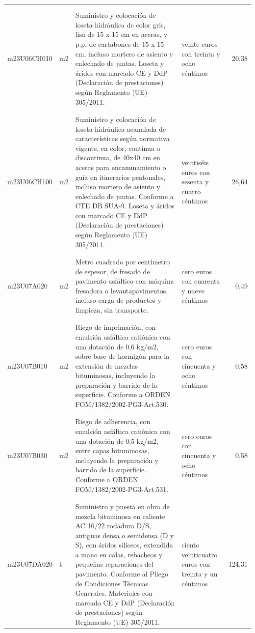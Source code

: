\begin{supertabular}{|l|l|p{5cm}|p{3cm}|r|}
&&&&\\%
&&&&\\%
m23U06CH010&m2&Suministro y colocación de loseta hidráulica de color gris, lisa de 15 x 15 cm en aceras, y p.p. de cartabones de 15 x 15 cm, incluso mortero de asiento y enlechado de juntas. Loseta y áridos con marcado CE y DdP (Declaración de prestaciones) según Reglamento (UE) 305/2011.&veinte euros con treinta y ocho céntimos&20,38\\%
&&&&\\%
&&&&\\%
m23U06CH100&m2&Suministro y colocación de loseta hidráulica acanalada de características según normativa vigente, en color, continua o discontinua, de 40x40 cm en aceras para encaminamiento o guía en itinerarios peatonales, incluso mortero de asiento y enlechado de juntas. Conforme a CTE DB SUA{-}9. Loseta y áridos con marcado CE y DdP (Declaración de prestaciones) según Reglamento (UE) 305/2011.&veintiséis euros con sesenta y cuatro céntimos&26,64\\%
&&&&\\%
&&&&\\%
m23U07A020&m2&Metro cuadrado por centímetro de espesor, de fresado de pavimento asfáltico con máquina fresadora o levantapavimentos, incluso carga de productos y limpieza, sin transporte.&cero euros con cuarenta y nueve céntimos&0,49\\%
&&&&\\%
&&&&\\%
m23U07B010&m2&Riego de imprimación, con emulsión asfáltica catiónica con una dotación de 0,6 kg/m2, sobre base de hormigón para la extensión de mezclas bituminosas, incluyendo la preparación y barrido de la superficie. Conforme a ORDEN FOM/1382/2002{-}PG3{-}Art.530.&cero euros con cincuenta y ocho céntimos&0,58\\%
&&&&\\%
&&&&\\%
m23U07B030&m2&Riego de adherencia, con emulsión asfáltica catiónica con una dotación de 0,5 kg/m2, entre capas bituminosas, incluyendo la preparación y barrido de la superficie. Conforme a ORDEN FOM/1382/2002{-}PG3{-}Art.531.&cero euros con cincuenta y ocho céntimos&0,58\\%
&&&&\\%
&&&&\\%
m23U07DA020&t&Suministro y puesta en obra de mezcla bituminosa en caliente AC 16/22 rodadura D/S, antiguas densa o semidensa (D y S), con áridos silíceos, extendida a mano en calas, rebacheos y pequeñas reparaciones del pavimento. Conforme al Pliego de Condiciones Técnicas Generales. Materiales con marcado CE y DdP (Declaración de prestaciones) según Reglamento (UE) 305/2011.&ciento veinticuatro euros con treinta y un céntimos&124,31\\%

\end{supertabular}
